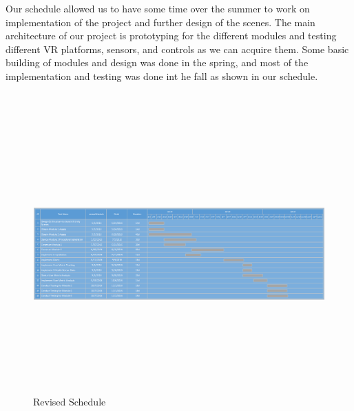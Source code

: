 \documentclass[a4paper,10pt]{article}
\begin{document}
	Our schedule allowed us to have some time over the summer to work on implementation of the project and further design of the scenes. The main architecture of our project is
	prototyping for the different modules and testing different VR platforms, sensors, and controls as we can acquire them. Some basic building of modules and design was done in the spring, and most of the implementation and testing was done int he fall as shown in our schedule.
	\par~\\
	\pagebreak
	\begin{figure}[H]
		\centerline{\includegraphics[width=600px,height=400px, angle=90]{revisedSchedule.png}}
		\caption{Revised Schedule}
		\label{fig:revisedSchedule}
	\end{figure}
\end{document}
